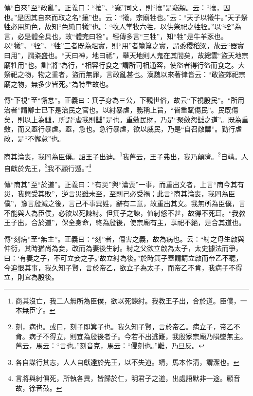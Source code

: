 {\noindent\zhuan{}\fzbyks 傳“自來”至“政亂”。正義曰：“攘”、“竊”同文，則“攘”是竊類。云：“攘，因也。”是因其自來而取之名“攘”也。云：“犧，宗廟牲也。”云：“天子以犧牛。”天子祭牲必用純色，故知“色純曰犧”也。：“牧人掌牧六牲，以供祭祀之牲牷。”以“牷”為言，必是體全具也，故“體完曰牷”。經傳多言“三牲”，知“牲”是牛羊豕也。以“犧”、“牷”、“牲”三者既為俎實，則“用”者簠簋之實，謂黍稷稻粱，故云“器實曰用”，謂粢盛也。“天曰神，地曰祗”，舉天地則人鬼在其間矣，故總雲“盜天地宗廟牲用”也。訓“將”為行，“相容行食之”謂所司相通容，使盜者得行盜而食之。大祭祀之物，物之重者，盜而無罪，言政亂甚也。漢魏以來著律皆云：“敢盜郊祀宗廟之物，無多少皆死。”為特重故也。 \par}

{\noindent\zhuan{}\fzbyks 傳“下視”至“懈怠”。正義曰：箕子身為三公，下觀世俗，故云“下視殷民”。“所用治者”謂卿士已下是治民之官也。以紂暴虐，務稱上旨，“皆重賦傷民”。民既傷矣，則以上為讎，所謂“虐我則讎”是也。重斂民財，乃是“聚斂怨讎之道”。既為重斂，而又亟行暴虐。亟，急也。急行暴虐，欲以威民，乃是“自召敵讎”。勤行虐政，是“不懈怠”也。 \par}

商其淪喪，我罔為臣僕。詔王子出迪。\footnote{商其沒亡，我二人無所為臣僕，欲以死諫紂。我教王子出，合於道。臣僕，一本無臣字。}我舊云，王子弗出，我乃顛隮。\footnote{刻，病也。或曰，刻子即箕子也。我久知子賢，言於帝乙。病立子，帝乙不肯。病子不得立，則宜為殷後者子。今若不出逃難，我殷家宗廟乃隕墜無主。舊云，馬云：“言也。”刻音克，馬云：“侵刻也。”難，乃旦反。}自靖。人自獻於先王，\footnote{各自謀行其志，人人自獻達於先王，以不失道。靖，馬本作清，謂潔也。}我不顧行遁。”\footnote{言將與紂俱死，所執各異，皆歸於仁，明君子之道，出處語默非一途。顧音故，徐音鼓。}

{\noindent\zhuan{}\fzbyks 傳“商其”至“於道”。正義曰：“有災”與“淪喪”一事，而重出文者，上言“商今其有災，我興受其敗”，逆言災雖未至，至則己必受禍；此言“商其淪喪，我罔為臣僕”，豫言殷滅之後，言己不事異姓，辭有二意，故重出其文。我無所為臣僕，言不能與人為臣僕，必欲以死諫紂。但箕子之諫，值紂怒不甚，故得不死耳。“我教王子出，合於道”，保全身命，終為殷後，使宗廟有主，享祀不絕，是合其道也。 \par}

{\noindent\zhuan{}\fzbyks 傳“刻病”至“無主”。正義曰：“刻”者，傷害之義，故為病也。云：“紂之母生啟與仲衍，其時猶尚為妾，改而為妻後生紂。紂之父欲立啟為太子，太史據法而爭，曰：‘有妻之子，不可立妾之子。’故立紂為後。”於時箕子蓋謂請立啟而帝乙不聽，今追恨其事，我久知子賢，言於帝乙，欲立子為太子，而帝乙不肯，我病子不得立，則宜為殷後。 \par}

